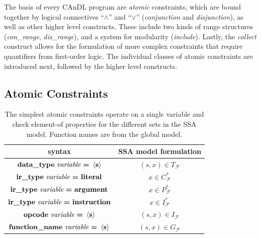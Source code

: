     \noindent
    The basis of every CAnDL program are {\it atomic} constraints, which are
    bound together by logical connectives ``$\land$'' and ``$\lor$''
    ({\it conjunction} and {\it disjunction}), as well as other higher level
    constructs.
    These include two kinds of range structures ({\it con\_range},
    {\it dis\_range}), and a system for modularity ({\it include}).
    Lastly, the {\it collect} construct allows for the formulation of more
    complex constraints that require quantifiers from first-order logic.
    The individual classes of atomic constraints are introduced next,
    followed by the higher level constructs.

\subsection{Atomic Constraints}

\begin{table}[t]
  \centering
  \begin{tabular}{|c|c|}
    \hline
    syntax & SSA model formulation \\
    \hline
    \hline
    $\text{\bf data\_type}\ \text{\it variable}\ \text{\bf =}\ \left<\text{\bf s}\right>$ &  $(s,x)\in T_\mathcal F$\\
    \hline
    $\text{\bf ir\_type}\ \text{\it variable}\ \text{\bf =}\ \text{\bf literal}$ &  $x\in C_\mathcal F^*$\\
    $\text{\bf ir\_type}\ \text{\it variable}\ \text{\bf =}\ \text{\bf argument}$ & $x\in P_\mathcal F^*$\\
    $\text{\bf ir\_type}\ \text{\it variable}\ \text{\bf =}\ \text{\bf instruction}$ & $x\in I_\mathcal F^*$\\
    \hline
    $\text{\bf opcode}\ \text{\it variable}\ \text{\bf =}\ \left<\text{\bf s}\right>$ & $(s,x)\in I_\mathcal F$\\
    \hline
    $\text{\bf function\_name}\ \text{\it variable}\ \text{\bf =}\ \left<\text{\bf s}\right>$ & $(s,x)\in G_\mathcal F$\\
    \hline
  \end{tabular}
  \caption{The simplest atomic constraints operate on a single variable and
           check element-of properties for the different sets in the SSA model.
           Function names are from the global model.\parfillskip=0pt}
  \label{onevaratomics}
\end{table}

